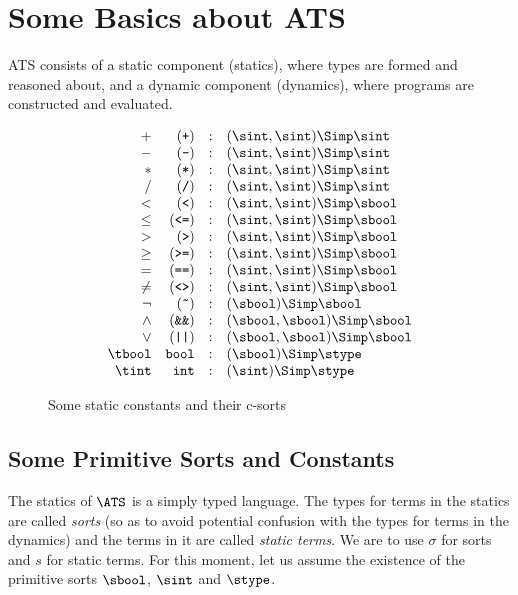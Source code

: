 \chapter{Some Basics about ATS}
ATS consists of a static component (statics), where types are formed and
reasoned about, and a dynamic component (dynamics), where programs are
constructed and evaluated.

\begin{figure}[thp]
\[\begin{array}{rrcl}
+ & \mbox{(\texttt{+})} & : & (\sint,\sint)\Simp\sint \\
- & \mbox{(\texttt{-})} & : & (\sint,\sint)\Simp\sint \\
* & \mbox{(\texttt{*})} & : & (\sint,\sint)\Simp\sint \\
/ & \mbox{(\texttt{/})} & : & (\sint,\sint)\Simp\sint \\
< & \mbox{(\texttt{<})} & : & (\sint,\sint)\Simp\sbool \\
\leq & \mbox{(\texttt{<=})} & : & (\sint,\sint)\Simp\sbool \\
> & \mbox{(\texttt{>})} & : & (\sint,\sint)\Simp\sbool \\
\geq & \mbox{(\texttt{>=})} & : & (\sint,\sint)\Simp\sbool \\
= & \mbox{(\texttt{==})} & : & (\sint,\sint)\Simp\sbool \\
\neq & \mbox{(\texttt{<>})} & : & (\sint,\sint)\Simp\sbool \\
\neg & \mbox{(\texttt{\~})} & : & (\sbool)\Simp\sbool \\
\land & \mbox{(\texttt{\&\&})} & : & (\sbool,\sbool)\Simp\sbool \\
\lor & \mbox{(\texttt{||})} & : & (\sbool,\sbool)\Simp\sbool \\
\tbool & \mbox{\texttt{bool}} & : & (\sbool)\Simp\stype \\
\tint & \mbox{\texttt{int}} & : & (\sint)\Simp\stype \\
\end{array}\]
\caption{Some static constants and their c-sorts}
\label{figure:some_static_constants}
\end{figure}
\section{Some Primitive Sorts and Constants}
The statics of $\ATS$ is a simply typed language. The types for terms in
the statics are called {\em sorts} (so as to avoid potential confusion with
the types for terms in the dynamics) and the terms in it are called {\em
static terms}. We are to use $\sigma$ for sorts and $s$ for static terms.
For this moment, let us assume the existence of the primitive sorts
$\sbool$, $\sint$ and $\stype$.

